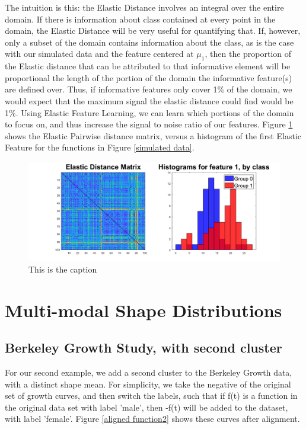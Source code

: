 \documentclass[]{article}
\begin{document}
The intuition is this: the Elastic Distance involves an integral over the entire domain. If there is information about class contained at every point in the domain, the Elastic Distance will be very useful for quantifying that. If, however, only a subset of the domain contains information about the class, as is the case with our simulated data and the feature centered at $\mu_1$, then the proportion of the Elastic distance that can be attributed to that informative element will be proportional the length of the portion of the domain the informative feature(s) are defined over. Thus, if informative features only cover 1\% of the domain, we would expect that the maximum signal the elastic distance could find would be 1\%. Using Elastic Feature Learning, we can learn which portions of the domain to focus on, and thus increase the signal to noise ratio of our features. Figure \ref{simulated data compare} shows the Elastic Pairwise distance matrix, versus a histogram of the first Elastic Feature for the functions in Figure \ref{simulated data}.      


\begin{center}
	\begin{figure}
		\includegraphics[width = \linewidth]{./simulated data features vs distances.png}
		\caption{This is the caption}
		\label{simulated data compare}
	\end{figure}
\end{center}


\section{Multi-modal Shape Distributions}

\subsection{Berkeley Growth Study, with second cluster}




For our second example, we add a second cluster to the Berkeley Growth data, with a distinct shape mean. For simplicity, we take the negative of the original set of growth curves, and then switch the labels, such that if f(t) is a function in the original data set with label 'male', then -f(t) will be added to the dataset, with label 'female'. Figure \ref{aligned function2} shows these curves after alignment. 
\end{document}
